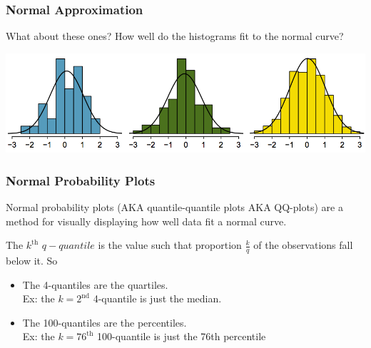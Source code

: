 \documentclass[handout]{beamer}
\newcommand{\blue}[1]{\textcolor{blue2}{#1}}
\begin{document}
\begin{frame}
\frametitle{Normal Approximation}

What about these ones?  How well do the histograms fit to the normal curve?

\begin{center}
\includegraphics[width=\textwidth]{figure/normal_hist.png}
\end{center}

\end{frame}


\begin{frame}
\frametitle{Normal Probability Plots}
\blue{Normal probability plots} (AKA quantile-quantile plots AKA QQ-plots) are a method for visually displaying how well data fit a normal curve.

\vspace{0.75cm}

\pause The $k^{\mbox{th}}$ \blue{$q-quantile$} is the value such that proportion $\frac{k}{q}$ of the observations fall below it.  So 
\begin{itemize}
\pause\item The 4-quantiles are the \blue{quartiles}.\\
Ex: the $k=2^{\mbox{nd}}$ 4-quantile is just the median.  
\pause\item The 100-quantiles are the \blue{percentiles}.\\
Ex: the $k=76^{\mbox{th}}$ 100-quantile is just the 76th percentile
\end{itemize}

\end{frame}
\end{document}

